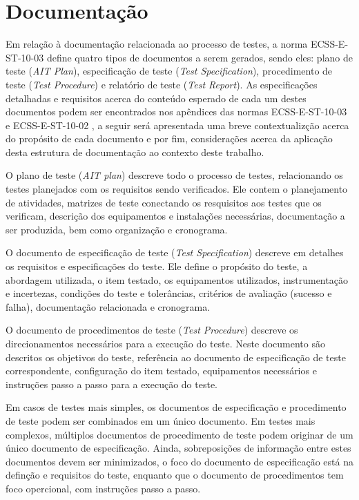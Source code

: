 \section{Documentação}

Em relação à documentação relacionada ao processo de testes, a norma ECSS-E-ST-10-03 \cite{ecss-e-st-10-03} define quatro tipos de documentos a serem gerados, sendo eles: plano de teste (\textit{AIT Plan}), especificação de teste (\textit{Test Specification}), procedimento de teste (\textit{Test Procedure}) e relatório de teste (\textit{Test Report}).
As especificações detalhadas e requisitos acerca do conteúdo esperado de cada um destes documentos podem ser encontrados nos apêndices das normas ECSS-E-ST-10-03 \cite{ecss-e-st-10-03} e ECSS-E-ST-10-02 \cite{ecss-e-st-10-02}, a seguir será apresentada uma breve contextualizção acerca do propósito de cada documento e por fim, considerações acerca da aplicação desta estrutura de documentação ao contexto deste trabalho.


O plano de teste (\textit{AIT plan}) descreve todo o processo de testes, relacionando os testes planejados com os requisitos sendo verificados.
Ele contem o planejamento de atividades, matrizes de teste conectando os resquisitos aos testes que os verificam, descrição dos equipamentos e instalações necessárias, documentação a ser produzida, bem como organização e cronograma.


O documento de especificação de teste (\textit{Test Specification}) descreve em detalhes os requisitos e especificações do teste.
Ele define o propósito do teste, a abordagem utilizada, o item testado, os equipamentos utilizados, instrumentação e incertezas, condições do teste e tolerâncias, critérios de avaliação (sucesso e falha), documentação relacionada e cronograma.


O documento de procedimentos de teste (\textit{Test Procedure}) descreve os direcionamentos necessários para a execução do teste.
Neste documento são descritos os objetivos do teste, referência ao documento de especificação de teste correspondente, configuração do item testado, equipamentos necessários e instruções passo a passo para a execução do teste.

Em casos de testes mais simples, os documentos de especificação e procedimento de teste podem ser combinados em um único documento.
Em testes mais complexos, múltiplos documentos de procedimento de teste podem originar de um único documento de especificação.
Ainda, sobreposições de informação entre estes documentos devem ser minimizados, o foco do documento de especificação está na definção e requisitos do teste, enquanto que o documento de procedimentos tem foco opercional, com instruções passo a passo.


